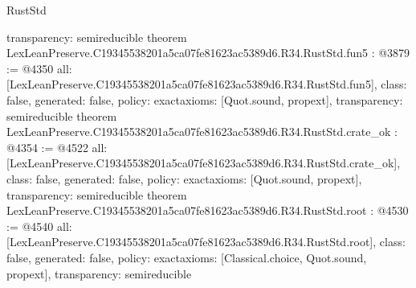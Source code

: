 \begin{lexlean}{RustStd}
\begin{coremodule}
{  transparency: semireducible
}
theorem LexLeanPreserve.C19345538201a5ca07fe81623ac5389d6.R34.RustStd.fun5 : @3879 := @4350 {
  all: [LexLeanPreserve.C19345538201a5ca07fe81623ac5389d6.R34.RustStd.fun5],
  class: false,
  generated: false,
  policy: exact{axioms: [Quot.sound, propext]},
  transparency: semireducible
}
theorem LexLeanPreserve.C19345538201a5ca07fe81623ac5389d6.R34.RustStd.crate_ok : @4354 := @4522 {
  all: [LexLeanPreserve.C19345538201a5ca07fe81623ac5389d6.R34.RustStd.crate_ok],
  class: false,
  generated: false,
  policy: exact{axioms: [Quot.sound, propext]},
  transparency: semireducible
}
theorem LexLeanPreserve.C19345538201a5ca07fe81623ac5389d6.R34.RustStd.root : @4530 := @4540 {
  all: [LexLeanPreserve.C19345538201a5ca07fe81623ac5389d6.R34.RustStd.root],
  class: false,
  generated: false,
  policy: exact{axioms: [Classical.choice, Quot.sound, propext]},
  transparency: semireducible
}


\end{coremodule}
\end{lexlean}
